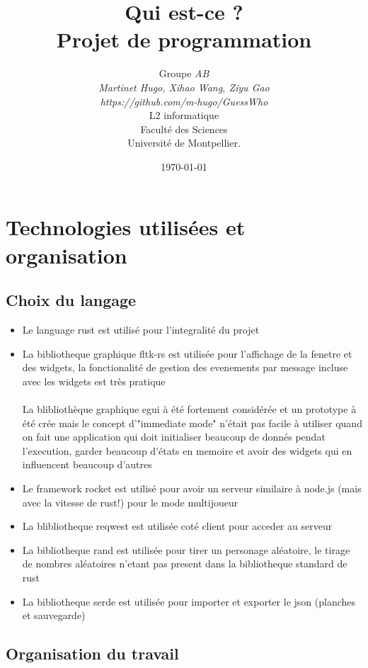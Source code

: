 \documentclass[a4paper]{article}
\title{  Qui est-ce ?\\         %
  Projet de programmation}
\author{Groupe \emph{AB}\\
  \emph{Martinet Hugo, Xihao Wang, Ziyu Gao}\\
  \emph{https://github.com/m-hugo/GuessWho}\\
  L2 informatique\\
  Faculté des Sciences\\
Université de Montpellier.}
\date{\today}
\begin{document}
\maketitle                    %

\section{ Technologies utilisées  et organisation} %

\subsection{Choix du langage}         %

\begin{itemize}            %
\item
  Le language rust est utilisé pour l'integralité du projet
\item
   La bibliotheque graphique fltk-rs est utilisée pour l'affichage de la fenetre et des widgets, la fonctionalité de gestion des evenements par message incluse avec les widgets est très pratique\\\\
   La blibliothèque graphique egui à été fortement considérée et un prototype à été crée mais le concept d'"immediate mode" n'était pas facile à utiliser quand on fait une application qui doit initialiser beaucoup de donnés pendat l'execution, garder beaucoup d'états en memoire et avoir des widgets qui en influencent beaucoup d'autres 
\item 
   Le framework rocket est utilisé pour avoir un serveur similaire à node.js (mais avec la vitesse de rust!) pour le mode multijoueur
\item
	La blibliotheque reqwest est utilisée coté client pour acceder au serveur
\item
	La bibliotheque rand est utilisée pour tirer un personage aléatoire, le tirage de nombres aléatoires n'etant pas present dans la bibliotheque standard de rust
\item
	La bibliotheque serde est utilisée pour importer et exporter le json (planches et sauvegarde)
   
\end{itemize}

\subsection{Organisation du travail}
\end{document}

